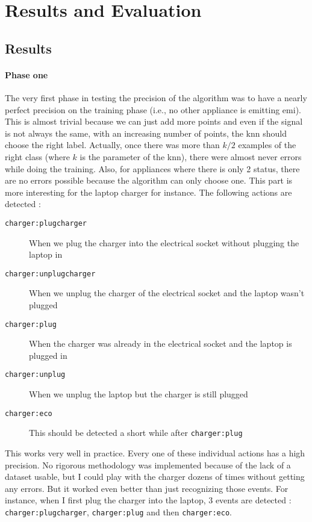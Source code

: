 \chapter{Results and Evaluation}
\section{Results}
\subsubsection{Phase one}
The very first phase in testing the precision of the algorithm was to have a nearly perfect precision on the training phase (i.e., no other appliance is emitting \acrshort{emi}). This is almost trivial because we can just add more points and even if the signal is not always the same, with an increasing number of points, the \acrshort{knn} should choose the right label. Actually, once there was more than $k/2$ examples of the right class (where $k$ is the parameter of the \acrshort{knn}), there were almost never errors while doing the training.
Also, for appliances where there is only 2 status, there are no errors possible because the algorithm can only choose one. This part is more interesting for the laptop charger for instance. The following actions are detected :
\begin{description}
\item[\texttt{charger:plugcharger}] When we plug the charger into the electrical socket without plugging the laptop in
\item[\texttt{charger:unplugcharger}] When we unplug the charger of the electrical socket and the laptop wasn't plugged
\item[\texttt{charger:plug}] When the charger was already in the electrical socket and the laptop is plugged in
\item[\texttt{charger:unplug}] When we unplug the laptop but the charger is still plugged
\item[\texttt{charger:eco}] This should be detected a short while after \texttt{charger:plug}
\end{description}

This works very well in practice. Every one of these individual actions has a high precision. No rigorous methodology was implemented because of the lack of a dataset usable, but I could play with the charger dozens of times without getting any errors. But it worked even better than just recognizing those events. For instance, when I first plug the charger into the laptop, 3 events are detected : \texttt{charger:plugcharger}, \texttt{charger:plug} and then \texttt{charger:eco}.

